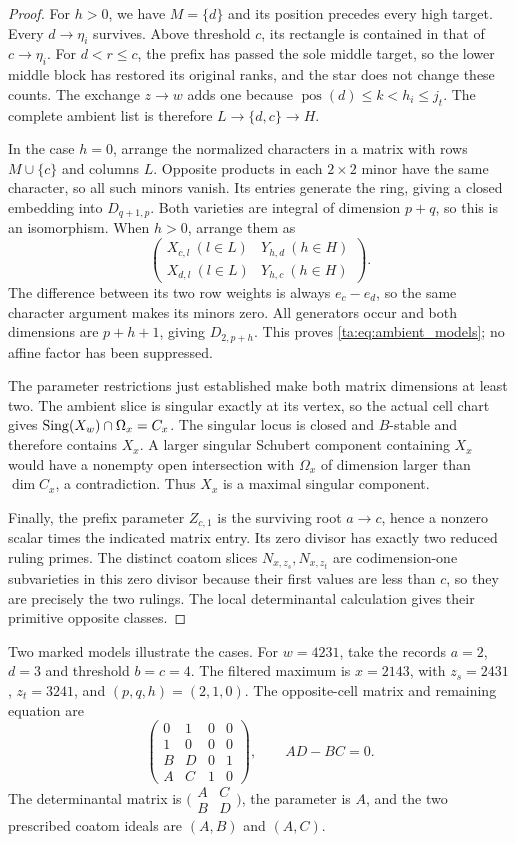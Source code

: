 \begin{proof}
For $h>0$, we have $M=\{d\}$ and its position precedes every high
target. Every $d\to\eta_i$ survives. Above threshold $c$, its
rectangle is contained in that of $c\to\eta_i$.
For $d<r\leq c$, the prefix has passed the sole middle target, so
the lower middle block has restored its original ranks, and the star
does not change these counts. The exchange $z\to w$ adds one
because $\operatorname{pos}(d)\leq k<h_i\leq j_t$.
The complete ambient list is therefore $L\to\{d,c\}\to H$.

In the case $h=0$, arrange the normalized characters in a matrix with
rows $M\cup\{c\}$ and columns $L$. Opposite products in each
$2\times2$ minor have the same character, so all such minors vanish.
Its entries generate the ring, giving a closed embedding into
$D_{q+1,p}$. Both varieties are integral of dimension $p+q$, so
this is an isomorphism. When $h>0$, arrange them as
\[
 \begin{pmatrix}
 X_{c,l}\ (l\in L)&Y_{h,d}\ (h\in H)\\
 X_{d,l}\ (l\in L)&Y_{h,c}\ (h\in H)
 \end{pmatrix}.
\]
The difference between its two row weights is always $e_c-e_d$,
so the same character argument makes its minors zero. All generators
occur and both dimensions are $p+h+1$, giving $D_{2,p+h}$.
This proves \eqref{ta:eq:ambient_models}; no affine factor has been
suppressed.

The parameter restrictions just established make both matrix dimensions at least two.
The ambient slice is singular exactly at its vertex, so the actual
cell chart gives $\operatorname{Sing}(X_w)\cap\Omega_x=C_x$.
The singular locus is closed and $B$-stable and therefore contains
$X_x$. A larger singular Schubert component containing $X_x$ would
have a nonempty open intersection with $\Omega_x$ of dimension
larger than $\dim C_x$, a contradiction. Thus $X_x$ is a maximal
singular component.

Finally, the prefix parameter $Z_{c,1}$ is the surviving root
$a\to c$, hence a nonzero scalar times the indicated matrix entry.
Its zero divisor has exactly two reduced ruling primes.
The distinct coatom slices $N_{x,z_s},N_{x,z_t}$ are codimension-one
subvarieties in this zero divisor because their first values are less
than $c$, so they are precisely the two rulings.
The local determinantal calculation gives their primitive opposite classes.
\end{proof}

Two marked models illustrate the cases. For $w=4231$, take the records
$a=2$, $d=3$ and threshold $b=c=4$. The filtered maximum is $x=2143$,
with $z_s=2431$, $z_t=3241$, and $(p,q,h)=(2,1,0)$.
The opposite-cell matrix and remaining equation are
\[
 \begin{pmatrix}
 0&1&0&0\\1&0&0&0\\B&D&0&1\\A&C&1&0
 \end{pmatrix},\qquad AD-BC=0.
\]
The determinantal matrix is $\bigl(\begin{smallmatrix}A&C\\B&D\end{smallmatrix}\bigr)$,
the parameter is $A$, and the two prescribed coatom ideals are
$(A,B)$ and $(A,C)$.

